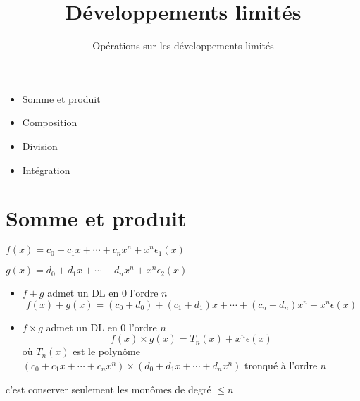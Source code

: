 







\title{{\bf Développements limités}}
\subtitle{Opérations sur les développements limités}

\begin{frame}
  
  \debutmontitre

  \pause

{\footnotesize
\hfill
{}
\begin{minipage}{0.6\textwidth}
  \begin{itemize}
    \item<3-> Somme et produit
    \item<4-> Composition
    \item<5-> Division
    \item<6-> Intégration
  \end{itemize}
\end{minipage}
}

\end{frame}

\setcounter{framenumber}{0}




\section{Somme et produit}

\begin{frame}
\center 
$f(x)=c_0+c_1x + \cdots +c_nx^n + x^n\epsilon_1(x)$ 

\smallskip 

$g(x)=d_0+d_1x + \cdots +d_nx^n + x^n\epsilon_2(x)$

\pause

\begin{proposition}
\begin{itemize}
  \item $f+g$  admet un DL en $0$ l'ordre $n$ 
\pause
\vspace*{-1ex}
$$f(x)+g(x)=(c_0+d_0)+(c_1+d_1)x+\cdots+(c_n+d_n)x^n +x^n\epsilon(x)$$
\pause
\vspace*{-2ex}
  \item $f\times g$ admet un DL en $0$ l'ordre $n$ 
\pause
\vspace*{-1ex}
$$f(x) \times g(x)= T_n(x)+x^n\epsilon (x)$$
où $T_n(x)$ est le  polynôme 
$(c_0+c_1x + \cdots +c_nx^n)\times(d_0+d_1x + \cdots +d_nx^n)$ 
tronqué à l'ordre $n$
\end{itemize}
\end{proposition}

\pause

 c'est conserver seulement les monômes de degré $\le n$
  
\end{frame}




